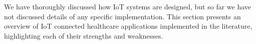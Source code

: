 

We have thoroughly discussed how \acs{IoT} systems are designed, but so far we have not discussed details of any specific implementation. This section presents an overview of \acs{IoT} connected healthcare applications implemented in the literature, highlighting each of their strengths and weaknesses. \bigskip
%

